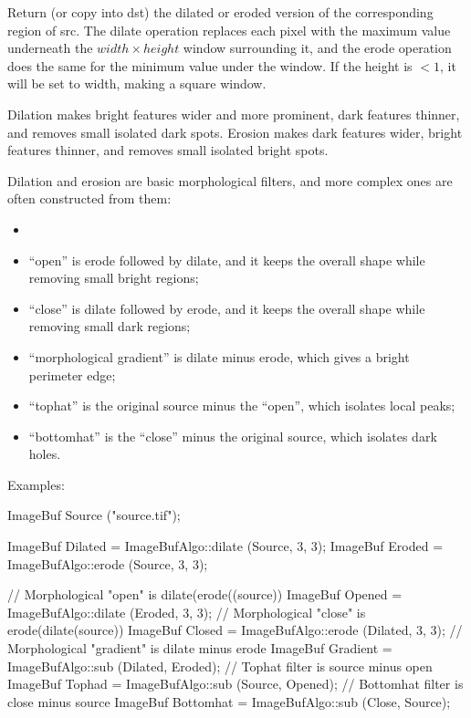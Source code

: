 Return (or copy into {\cf dst}) the dilated or eroded version of the
corresponding region of {\cf src}.  The dilate operation replaces each pixel
with the maximum value underneath the $\mathit{width} \times \mathit{height}$
window surrounding it, and the erode operation does the same for the minimum
value under the window. If the height is $< 1$, it will be set to width,
making a square window.

Dilation makes bright features wider and more prominent, dark features
thinner, and removes small isolated dark spots. Erosion makes dark features
wider, bright features thinner, and removes small isolated bright spots.

Dilation and erosion are basic morphological filters, and more complex ones
are often constructed from them:
\begin{itemize}
\item
\item ``open'' is erode followed by dilate, and it keeps the overall shape
while removing small bright regions;
\item ``close'' is dilate followed by erode, and it keeps the overall shape
while removing small dark regions;
\item ``morphological gradient'' is dilate minus erode, which gives a
bright perimeter edge;
\item ``tophat'' is the original source minus the ``open'', which isolates
local peaks;
\item ``bottomhat'' is the ``close'' minus the original source, which
isolates dark holes.
\end{itemize}

\smallskip
\noindent Examples:
\begin{code}
    ImageBuf Source ("source.tif");

    ImageBuf Dilated = ImageBufAlgo::dilate (Source, 3, 3);
    ImageBuf Eroded  = ImageBufAlgo::erode (Source, 3, 3);

    // Morphological "open" is dilate(erode((source))
    ImageBuf Opened = ImageBufAlgo::dilate (Eroded, 3, 3);
    // Morphological "close" is erode(dilate(source))
    ImageBuf Closed = ImageBufAlgo::erode (Dilated, 3, 3);
    // Morphological "gradient" is dilate minus erode
    ImageBuf Gradient = ImageBufAlgo::sub (Dilated, Eroded);
    // Tophat filter is source minus open
    ImageBuf Tophad = ImageBufAlgo::sub (Source, Opened);
    // Bottomhat filter is close minus source
    ImageBuf Bottomhat = ImageBufAlgo::sub (Close, Source);
\end{code}

